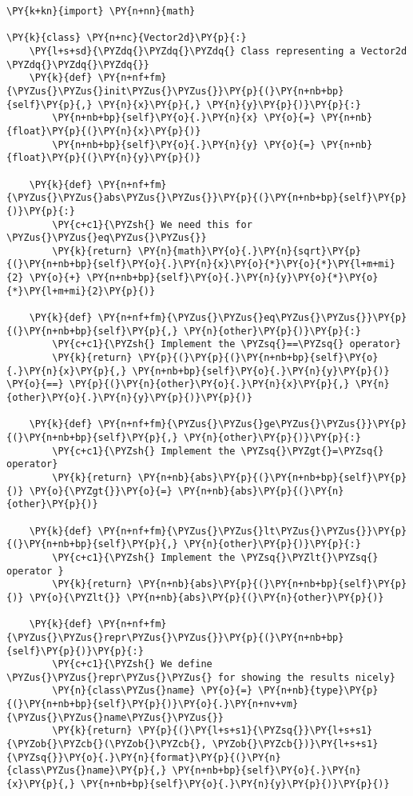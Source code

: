 \begin{Verbatim}[label=\makebox{\url{https://github.com/lucabaldini/cmepda/tree/master/slides/latex/snippets/vector2d\_comparable.py}},commandchars=\\\{\}]
\PY{k+kn}{import} \PY{n+nn}{math}

\PY{k}{class} \PY{n+nc}{Vector2d}\PY{p}{:}
    \PY{l+s+sd}{\PYZdq{}\PYZdq{}\PYZdq{} Class representing a Vector2d \PYZdq{}\PYZdq{}\PYZdq{}}   
    \PY{k}{def} \PY{n+nf+fm}{\PYZus{}\PYZus{}init\PYZus{}\PYZus{}}\PY{p}{(}\PY{n+nb+bp}{self}\PY{p}{,} \PY{n}{x}\PY{p}{,} \PY{n}{y}\PY{p}{)}\PY{p}{:}
        \PY{n+nb+bp}{self}\PY{o}{.}\PY{n}{x} \PY{o}{=} \PY{n+nb}{float}\PY{p}{(}\PY{n}{x}\PY{p}{)}
        \PY{n+nb+bp}{self}\PY{o}{.}\PY{n}{y} \PY{o}{=} \PY{n+nb}{float}\PY{p}{(}\PY{n}{y}\PY{p}{)}
    
    \PY{k}{def} \PY{n+nf+fm}{\PYZus{}\PYZus{}abs\PYZus{}\PYZus{}}\PY{p}{(}\PY{n+nb+bp}{self}\PY{p}{)}\PY{p}{:}
        \PY{c+c1}{\PYZsh{} We need this for \PYZus{}\PYZus{}eq\PYZus{}\PYZus{}}
        \PY{k}{return} \PY{n}{math}\PY{o}{.}\PY{n}{sqrt}\PY{p}{(}\PY{n+nb+bp}{self}\PY{o}{.}\PY{n}{x}\PY{o}{*}\PY{o}{*}\PY{l+m+mi}{2} \PY{o}{+} \PY{n+nb+bp}{self}\PY{o}{.}\PY{n}{y}\PY{o}{*}\PY{o}{*}\PY{l+m+mi}{2}\PY{p}{)}
    
    \PY{k}{def} \PY{n+nf+fm}{\PYZus{}\PYZus{}eq\PYZus{}\PYZus{}}\PY{p}{(}\PY{n+nb+bp}{self}\PY{p}{,} \PY{n}{other}\PY{p}{)}\PY{p}{:}
        \PY{c+c1}{\PYZsh{} Implement the \PYZsq{}==\PYZsq{} operator}
        \PY{k}{return} \PY{p}{(}\PY{p}{(}\PY{n+nb+bp}{self}\PY{o}{.}\PY{n}{x}\PY{p}{,} \PY{n+nb+bp}{self}\PY{o}{.}\PY{n}{y}\PY{p}{)} \PY{o}{==} \PY{p}{(}\PY{n}{other}\PY{o}{.}\PY{n}{x}\PY{p}{,} \PY{n}{other}\PY{o}{.}\PY{n}{y}\PY{p}{)}\PY{p}{)}
        
    \PY{k}{def} \PY{n+nf+fm}{\PYZus{}\PYZus{}ge\PYZus{}\PYZus{}}\PY{p}{(}\PY{n+nb+bp}{self}\PY{p}{,} \PY{n}{other}\PY{p}{)}\PY{p}{:}
        \PY{c+c1}{\PYZsh{} Implement the \PYZsq{}\PYZgt{}=\PYZsq{} operator}
        \PY{k}{return} \PY{n+nb}{abs}\PY{p}{(}\PY{n+nb+bp}{self}\PY{p}{)} \PY{o}{\PYZgt{}}\PY{o}{=} \PY{n+nb}{abs}\PY{p}{(}\PY{n}{other}\PY{p}{)}
        
    \PY{k}{def} \PY{n+nf+fm}{\PYZus{}\PYZus{}lt\PYZus{}\PYZus{}}\PY{p}{(}\PY{n+nb+bp}{self}\PY{p}{,} \PY{n}{other}\PY{p}{)}\PY{p}{:}
        \PY{c+c1}{\PYZsh{} Implement the \PYZsq{}\PYZlt{}\PYZsq{} operator }
        \PY{k}{return} \PY{n+nb}{abs}\PY{p}{(}\PY{n+nb+bp}{self}\PY{p}{)} \PY{o}{\PYZlt{}} \PY{n+nb}{abs}\PY{p}{(}\PY{n}{other}\PY{p}{)}
        
    \PY{k}{def} \PY{n+nf+fm}{\PYZus{}\PYZus{}repr\PYZus{}\PYZus{}}\PY{p}{(}\PY{n+nb+bp}{self}\PY{p}{)}\PY{p}{:}
        \PY{c+c1}{\PYZsh{} We define \PYZus{}\PYZus{}repr\PYZus{}\PYZus{} for showing the results nicely}
        \PY{n}{class\PYZus{}name} \PY{o}{=} \PY{n+nb}{type}\PY{p}{(}\PY{n+nb+bp}{self}\PY{p}{)}\PY{o}{.}\PY{n+nv+vm}{\PYZus{}\PYZus{}name\PYZus{}\PYZus{}}
        \PY{k}{return} \PY{p}{(}\PY{l+s+s1}{\PYZsq{}}\PY{l+s+s1}{\PYZob{}\PYZcb{}(\PYZob{}\PYZcb{}, \PYZob{}\PYZcb{})}\PY{l+s+s1}{\PYZsq{}}\PY{o}{.}\PY{n}{format}\PY{p}{(}\PY{n}{class\PYZus{}name}\PY{p}{,} \PY{n+nb+bp}{self}\PY{o}{.}\PY{n}{x}\PY{p}{,} \PY{n+nb+bp}{self}\PY{o}{.}\PY{n}{y}\PY{p}{)}\PY{p}{)}
\end{Verbatim}